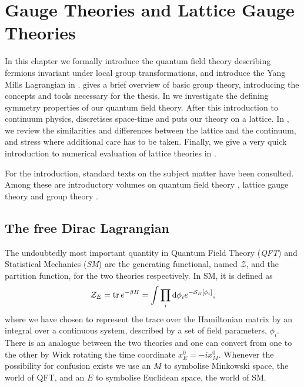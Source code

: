 \chapter{Gauge Theories and Lattice Gauge Theories} \label{chap2}

In this chapter we formally introduce the quantum field theory describing
fermions invariant under local group transformations, and introduce the Yang
Mills Lagrangian in .
 gives a brief overview of basic group
theory, introducing the concepts and tools necessary for the thesis. In
 we investigate the defining symmetry properties of our
quantum field theory. After this introduction to continuum physics,
 discretises space-time and puts our theory on a
lattice. In , we review the
similarities and differences between the lattice and the continuum, and stress
where additional care has to be taken. Finally, we give a very quick introduction
to numerical evaluation of lattice theories in .

For the introduction, standard texts on the subject matter have been consulted.
Among these are introductory volumes on quantum field theory
\citep[e.g.][]{peskin1995introduction,maggiore2004modern}, lattice gauge theory
\citep[e.g.][]{montvay1997quantum,gattringer2009quantum} and group theory
\citep[e.g.][]{georgi1999lie,fulton2013representation}.

\section{The free Dirac Lagrangian} \label{sec:continuum_gauge}

The undoubtedly most important quantity in Quantum Field Theory (\emph{QFT}) and
Statistical Mechanics (\emph{SM}) are the generating functional, named
$\mathcal{Z}$, and the partition function, for the two theories respectively.
In SM, it is defined as
%
\begin{equation} \label{eq:partition}
  \mathcal{Z}_E = \operatorname{tr} e^{-\beta H}
    = \int \prod_i \mathrm{d} \phi_i e^{-\mathcal{S}_E[\phi_i]},
\end{equation}
%
where we have chosen to represent the trace over the Hamiltonian matrix by an
integral over a continuous system, described by a set of field parameters,
$\phi_i$. There is an analogue between the two theories and one can convert from
one to the other by Wick rotating the time coordinate $x^0_E = -i x^0_M$.
Whenever the possibility for confusion exists we use an $M$ to symbolise
Minkowski space, the world of QFT, and an $E$ to symbolise Euclidean space, the
world of SM.

